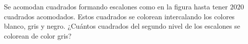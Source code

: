 Se acomodan cuadrados formando escalones como en la figura hasta tener $2020$ cuadrados acomodados. \newline 
Estos cuadrados se colorean intercalando los colores blanco, gris y negro. ¿Cuántos cuadrados del segundo nivel de los escalones se colorean de color gris?